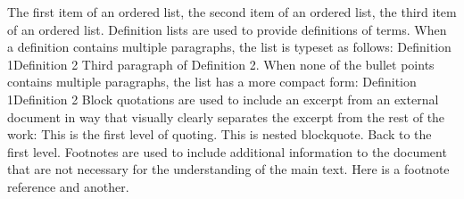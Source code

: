 {}\markdownRendererOlBeginTight
{}The first item of an ordered list,\markdownRendererOlItemEnd 
{}the second item of an ordered list,\markdownRendererOlItemEnd 
{}the third item of an ordered list.\markdownRendererOlItemEnd 
\markdownRendererOlEndTight \markdownRendererInterblockSeparator
{}Definition lists are used to provide definitions of terms. When a definition contains multiple paragraphs, the list is typeset as follows:\markdownRendererInterblockSeparator
{}\markdownRendererDlBegin
{}\markdownRendererDlDefinitionBegin Definition 1\markdownRendererDlDefinitionEnd \markdownRendererDlItemEnd {}\markdownRendererDlDefinitionBegin Definition 2\markdownRendererInterblockSeparator
{}\markdownRendererInterblockSeparator
{}Third paragraph of Definition 2.\markdownRendererDlDefinitionEnd \markdownRendererDlItemEnd 
\markdownRendererDlEnd\markdownRendererInterblockSeparator
{}When none of the bullet points contains multiple paragraphs, the list has a more compact form:\markdownRendererInterblockSeparator
{}\markdownRendererDlBeginTight
{}\markdownRendererDlDefinitionBegin Definition 1\markdownRendererDlDefinitionEnd \markdownRendererDlItemEnd {}\markdownRendererDlDefinitionBegin Definition 2\markdownRendererDlDefinitionEnd \markdownRendererDlItemEnd 
\markdownRendererDlEndTight\markdownRendererInterblockSeparator
{}Block quotations are used to include an excerpt from an external document in way that visually clearly separates the excerpt from the rest of the work:\markdownRendererInterblockSeparator
{}\markdownRendererBlockQuoteBegin
This is the first level of quoting.\markdownRendererInterblockSeparator
{}\markdownRendererBlockQuoteBegin
This is nested blockquote.
\markdownRendererBlockQuoteEnd \markdownRendererInterblockSeparator
{}Back to the first level.
\markdownRendererBlockQuoteEnd \markdownRendererInterblockSeparator
{}Footnotes are used to include additional information to the document that are not necessary for the understanding of the main text. Here is a footnote reference and another.\relax